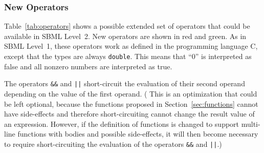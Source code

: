 \documentclass[10pt]{cekarticle}
\begin{document}
\subsubsection{New Operators}

Table~\ref{tab:operators} shows a possible extended set of operators that
could be available in SBML Level~2.  New operators are shown in
{\color{red}red} and {\color{green}green}.  As in SBML Level~1, these
operators work as defined in the programming language C, except that the
types are always \texttt{double}.  This means that ``0'' is interpreted as
false and all nonzero numbers are interpreted as true.

The operators \verb|&&| and \verb+||+ short-circuit the evaluation of their
second operand depending on the value of the first operand.
({\color{green} This is an optimization that could be left optional,
  because the functions proposed in Section~\ref{sec:functions} cannot have
  side-effects and therefore short-circuiting cannot change the result
  value of an expression.  However, if the definition of functions is
  changed to support multi-line functions with bodies and possible
  side-effects, it will then become necessary to require short-circuiting
  the evaluation of the operators \verb|&&| and \verb+||+.})
\end{document}
